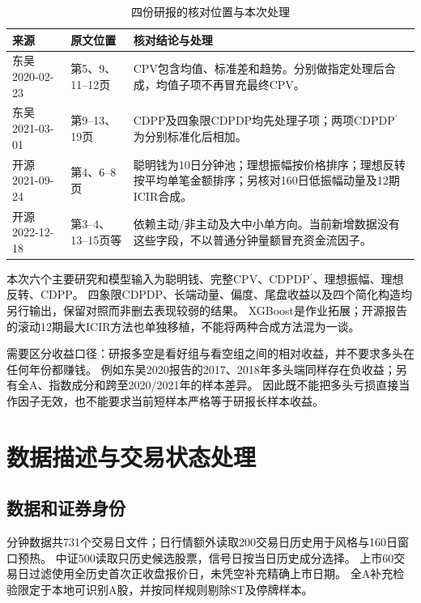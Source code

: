 \documentclass[UTF8,zihao=-4,fontset=fandol]{ctexart}
\begin{document}
\begin{table}[H]\centering\small
\caption{四份研报的核对位置与本次处理}
\begin{tabularx}{\linewidth}{p{27mm}p{29mm}X}\toprule
来源 & 原文位置 & 核对结论与处理\\\midrule
东吴2020-02-23 & 第5、9、11--12页 & CPV包含均值、标准差和趋势。分别做指定处理后合成，均值子项不再冒充最终CPV。\\
东吴2021-03-01 & 第9--13、19页 & CDPP及四象限CDPDP均先处理子项；两项CDPDP$^{\prime}$为分别标准化后相加。\\
开源2021-09-24 & 第4、6--8页 & 聪明钱为10日分钟池；理想振幅按价格排序；理想反转按平均单笔金额排序；另核对160日低振幅动量及12期ICIR合成。\\
开源2022-12-18 & 第3--4、13--15页等 & 依赖主动/非主动及大中小单方向。当前新增数据没有这些字段，不以普通分钟量额冒充资金流因子。\\\bottomrule
\end{tabularx}\end{table}

本次六个主要研究和模型输入为聪明钱、完整CPV、CDPDP$^{\prime}$、理想振幅、理想反转、CDPP。
四象限CDPDP、长端动量、偏度、尾盘收益以及四个简化构造均另行输出，保留对照而非删去表现较弱的结果。
XGBoost是作业拓展；开源报告的滚动12期最大ICIR方法也单独移植，不能将两种合成方法混为一谈。

需要区分收益口径：研报多空是看好组与看空组之间的相对收益，并不要求多头在任何年份都赚钱。
例如东吴2020报告的2017、2018年多头端同样存在负收益；另有全A、指数成分和跨至2020/2021年的样本差异。
因此既不能把多头亏损直接当作因子无效，也不能要求当前短样本严格等于研报长样本收益。

\clearpage
\section{数据描述与交易状态处理}
\subsection{数据和证券身份}
分钟数据共731个交易日文件；日行情额外读取200交易日历史用于风格与160日窗口预热。
中证500读取\CandidateCount 只历史候选股票，信号日按当日历史成分选择。
上市60交易日过滤使用全历史首次正收盘报价日，未凭空补充精确上市日期。
全A补充检验限定于本地可识别A股，并按同样规则剔除ST及停牌样本。
\end{document}
